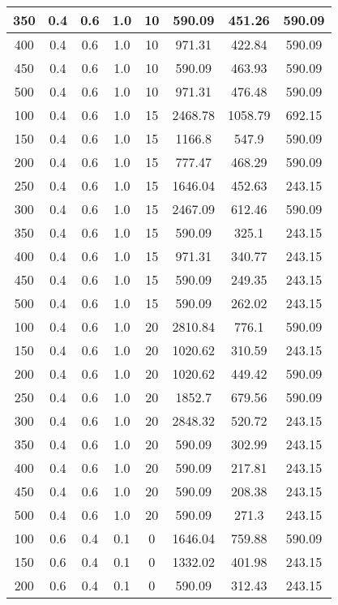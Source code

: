 \documentclass[a4paper, 12pt]{extreport}
\begin{document}
\begin{itemize}
\begin{longtable}{|c|c|c|c|c|c|c|c|}
			350 & 0.4 & 0.6 & 1.0 & 10 & 590.09 & 451.26 & 590.09 \\\hline
			400 & 0.4 & 0.6 & 1.0 & 10 & 971.31 & 422.84 & 590.09 \\\hline
			450 & 0.4 & 0.6 & 1.0 & 10 & 590.09 & 463.93 & 590.09 \\\hline
			500 & 0.4 & 0.6 & 1.0 & 10 & 971.31 & 476.48 & 590.09 \\\hline
			100 & 0.4 & 0.6 & 1.0 & 15 & 2468.78 & 1058.79 & 692.15 \\\hline
			150 & 0.4 & 0.6 & 1.0 & 15 & 1166.8 & 547.9 & 590.09 \\\hline
			200 & 0.4 & 0.6 & 1.0 & 15 & 777.47 & 468.29 & 590.09 \\\hline
			250 & 0.4 & 0.6 & 1.0 & 15 & 1646.04 & 452.63 & 243.15 \\\hline
			300 & 0.4 & 0.6 & 1.0 & 15 & 2467.09 & 612.46 & 590.09 \\\hline
			350 & 0.4 & 0.6 & 1.0 & 15 & 590.09 & 325.1 & 243.15 \\\hline
			400 & 0.4 & 0.6 & 1.0 & 15 & 971.31 & 340.77 & 243.15 \\\hline
			450 & 0.4 & 0.6 & 1.0 & 15 & 590.09 & 249.35 & 243.15 \\\hline
			500 & 0.4 & 0.6 & 1.0 & 15 & 590.09 & 262.02 & 243.15 \\\hline
			100 & 0.4 & 0.6 & 1.0 & 20 & 2810.84 & 776.1 & 590.09 \\\hline
			150 & 0.4 & 0.6 & 1.0 & 20 & 1020.62 & 310.59 & 243.15 \\\hline
			200 & 0.4 & 0.6 & 1.0 & 20 & 1020.62 & 449.42 & 590.09 \\\hline
			250 & 0.4 & 0.6 & 1.0 & 20 & 1852.7 & 679.56 & 590.09 \\\hline
			300 & 0.4 & 0.6 & 1.0 & 20 & 2848.32 & 520.72 & 243.15 \\\hline
			350 & 0.4 & 0.6 & 1.0 & 20 & 590.09 & 302.99 & 243.15 \\\hline
			400 & 0.4 & 0.6 & 1.0 & 20 & 590.09 & 217.81 & 243.15 \\\hline
			450 & 0.4 & 0.6 & 1.0 & 20 & 590.09 & 208.38 & 243.15 \\\hline
			500 & 0.4 & 0.6 & 1.0 & 20 & 590.09 & 271.3 & 243.15 \\\hline
			100 & 0.6 & 0.4 & 0.1 & 0 & 1646.04 & 759.88 & 590.09 \\\hline
			150 & 0.6 & 0.4 & 0.1 & 0 & 1332.02 & 401.98 & 243.15 \\\hline
			200 & 0.6 & 0.4 & 0.1 & 0 & 590.09 & 312.43 & 243.15 \\\hline

\end{longtable}
\end{itemize}
\end{document}
